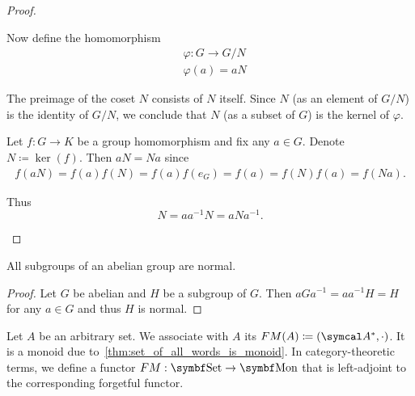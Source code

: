 \begin{proof}
\begin{description}
    Now define the homomorphism
    \begin{align*}
      &\varphi: G \to G / N \\
      &\varphi(a) = aN
    \end{align*}

    The preimage of the coset \( N \) consists of \( N \) itself. Since \( N \) (as an element of \( G / N \)) is the identity of \( G / N \), we conclude that \( N \) (as a subset of \( G \)) is the kernel of \( \varphi \).

     Let \( f: G \to K \) be a group homomorphism and fix any \( a \in G \). Denote \( N \coloneqq \ker(f) \). Then \( aN = Na \) since
    \begin{align*}
      f(aN)
      =
      f(a) f(N)
      =
      f(a) f(e_G)
      =
      f(a)
      =
      f(N) f(a)
      =
      f(Na).
    \end{align*}

    Thus
    \begin{equation*}
      N = aa^{-1}N = aNa^{-1}.
    \end{equation*}
  \end{description}
\end{proof}

\begin{proposition}\label{thm:abelian_normal_subgroups}
  All subgroups of an abelian group are normal.
\end{proposition}
\begin{proof}
  Let \( G \) be abelian and \( H \) be a subgroup of \( G \). Then \( aGa^{-1} = aa^{-1}H = H \) for any \( a \in G \) and thus \( H \) is normal.
\end{proof}

\begin{definition}\label{def:free_monoid}\cite[306]{Knapp2016BAlg}
  Let \( A \) be an arbitrary set. We associate with \( A \) its  \( FM(A) \coloneqq (\Cal{A}^{*}, \cdot) \). It is a monoid due to~\cref{thm:set_of_all_words_is_monoid}. In category-theoretic terms, we define a functor \( FM: \Bold{Set} \to \Bold{Mon} \) that is left-adjoint to the corresponding forgetful functor.
\end{definition}

